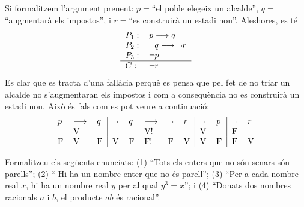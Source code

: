 \begin{solucio}
Si formalitzem l'argument prenent: $p=$\textquotedblleft el poble elegeix un
alcalde\textquotedblright, $q=$\textquotedblleft augmentar\`{a} els
impostos\textquotedblright, i $r=$\textquotedblleft es construir\`{a} un
estadi nou\textquotedblright. Aleshores, es t\'{e}%
\[%
\begin{tabular}
[c]{ll}%
$P_{1}:$ & $p\longrightarrow q$\\
$P_{2}:$ & $\lnot q\longrightarrow\lnot r$\\
$P_{3}:$ & $\lnot p$\\\hline
$C:$ & $\lnot r$%
\end{tabular}
\]
Es clar que es tracta d'una fal\textperiodcentered l\`{a}cia perqu\`{e} es
pensa que pel fet de no triar un alcalde no s'augmentaran els impostos i com a
consequ\`{e}ncia no es construir\`{a} un estadi nou. Aix\`{o} \'{e}s fals com
es pot veure a continuaci\'{o}:%
\[%
\begin{tabular}
[c]{lll|lllll|ll|ll}%
$p$ & $\longrightarrow$ & $q$ & $\lnot$ & $q$ & $\longrightarrow$ & $\lnot$ &
$r$ & $\lnot$ & $p$ & $\lnot$ & $r$\\
& V &  &  &  & V! &  &  & V &  & F & \\
F & V & F & V & F & F! & F & V & V & F & F & V
\end{tabular}
\]

\end{solucio}

\begin{exercici}
Formalitzeu els seg\"{u}ents enunciats: (1) \textquotedblleft Tots els enters
que no s\'{o}n senars s\'{o}n parells\textquotedblright; (2) \textquotedblleft
Hi ha un nombre enter que no \'{e}s parell\textquotedblright; (3)
\textquotedblleft Per a cada nombre real $x$, hi ha un nombre real $y$ per al
qual $y^{3}=x$\textquotedblright; i (4) \textquotedblleft Donats dos nombres
racionals $a$ i $b$, el producte $ab$ \'{e}s racional\textquotedblright.
\end{exercici}

